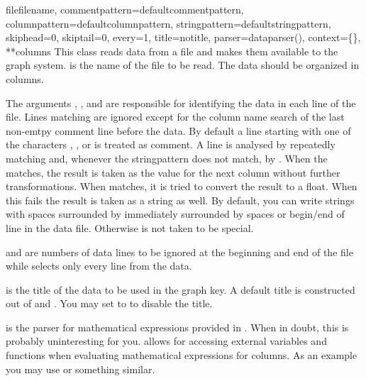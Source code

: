\begin{classdesc}{file}{filename,
                        commentpattern=defaultcommentpattern,
                        columnpattern=defaultcolumnpattern,
                        stringpattern=defaultstringpattern,
                        skiphead=0, skiptail=0, every=1, title=notitle,
                        parser=dataparser(), context=\{\}, **columns}
  This class reads data from a file and makes them available to the
  graph system.  is the name of the file to be read.
  The data should be organized in columns.

  The arguments , , and
   are responsible for identifying the data in each
  line of the file. Lines matching  are ignored
  except for the column name search of the last non-emtpy comment line
  before the data. By default a line starting with one of the
  characters \character{\#}, \character{\%}, or \character{!} is
  treated as comment. A line is analysed by repeatedly matching
   and, whenever the stringpattern does not match,
  by . When the  matches, the
  result is taken as the value for the next column without further
  transformations. When  matches, it is tried to
  convert the result to a float. When this fails the result is taken
  as a string as well. By default, you can write strings with spaces
  surrounded by \character{\textquotedbl} immediately surrounded by
  spaces or begin/end of line in the data file. Otherwise
  \character{\textquotedbl} is not taken to be special.

   and  are numbers of data lines to be
  ignored at the beginning and end of the file while 
  selects only every  line from the data.

   is the title of the data to be used in the graph key. A
  default title is constructed out of  and
  . You may set  to  to disable
  the title.

   is the parser for mathematical expressions provided in
  . When in doubt, this is probably uninteresting for
  you.  allows for accessing external variables and
  functions when evaluating mathematical expressions for columns. As
  an example you may use  or something similar.


\end{classdesc}
